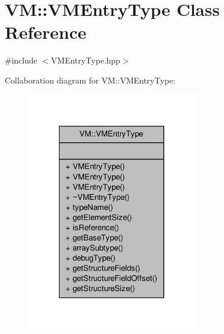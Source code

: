 \hypertarget{class_v_m_1_1_v_m_entry_type}{\section{V\-M\-:\-:V\-M\-Entry\-Type Class Reference}
\label{class_v_m_1_1_v_m_entry_type}
}


{\ttfamily \#include $<$V\-M\-Entry\-Type.\-hpp$>$}



Collaboration diagram for V\-M\-:\-:V\-M\-Entry\-Type\-:
\nopagebreak
\begin{figure}[H]
\begin{center}
\leavevmode
\includegraphics[width=212pt]{class_v_m_1_1_v_m_entry_type__coll__graph}
\end{center}
\end{figure}
